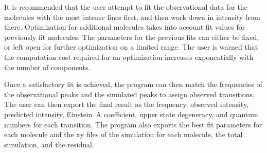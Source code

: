 It is recommended that the user attempt to fit the observational data for the molecules with the most intense lines first, and then work down in intensity from there.  Optimization for additional molecules takes into account fit values for previously fit molecules.  The parameters for the previous fits can either be fixed, or left open for further optimization on a limited range.  The user is warned that the computation cost required for an optimization increases exponentially with the number of components.

Once a satisfactory fit is achieved, the program can then match the frequencies of the observational peaks and the simulated peaks to assign observed transitions.  The user can then export the final result as the frequency, observed intensity, predicted intensity, Einstein~A coefficient, upper state degeneracy, and quantum numbers for each transition.  The program also exports the best fit parameters for each molecule and the xy files of the simulation for each molecule, the total simulation, and the residual.



